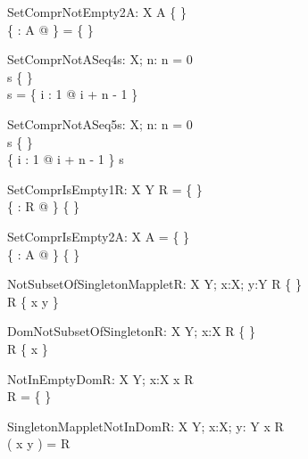 \begin{theorem}{SetComprNotEmpty2}{A: \power X}
A \neq \{ \} \\
\{ \anything : A @ \anything \} = \{ \}
\end{theorem}

\begin{theorem}{SetComprNotASeq4}{s: \seq X; n: \nat}
n = 0 \\
s \neq \{ \} \\
\dom s = \dom \{ i : 1 \upto \anything @ i + n - 1 \mapsto \anything \}
\end{theorem}

\begin{theorem}{SetComprNotASeq5}{s: \seq X; n: \nat}
n = 0 \\
s \neq \{ \} \\
\dom \{ i : 1 \upto \anything @ i + n - 1 \mapsto \anything \} \subset \dom s
\end{theorem}

\begin{theorem}{SetComprIsEmpty1}{R: X \rel Y}
R = \{ \} \\
\{ \anything : \dom R @ \anything \} \neq \{ \}
\end{theorem}

\begin{theorem}{SetComprIsEmpty2}{A: \power X}
A = \{ \} \\
\{ \anything : A @ \anything \} \neq \{ \}
\end{theorem}


\begin{theorem}{NotSubsetOfSingletonMapplet}{R: X \rel Y; x:X; y:Y}
R \neq \{ \} \\
\dom R \subset \dom \{ x \mapsto y \} 
\end{theorem}

\begin{theorem}{DomNotSubsetOfSingleton}{R: X \rel Y; x:X}
R \neq \{ \} \\
\dom R \subset \{ x \} 
\end{theorem}

\begin{theorem}{NotInEmptyDom}{R: X \rel Y; x:X}
x \in \dom R \\
R = \{ \}
\end{theorem}

\begin{theorem}{SingletonMappletNotInDom}{R: X \rel Y; x:X; y: Y}
x \notin \dom R \\
\dom \se( x \mapsto y ) = \dom R
\end{theorem}


